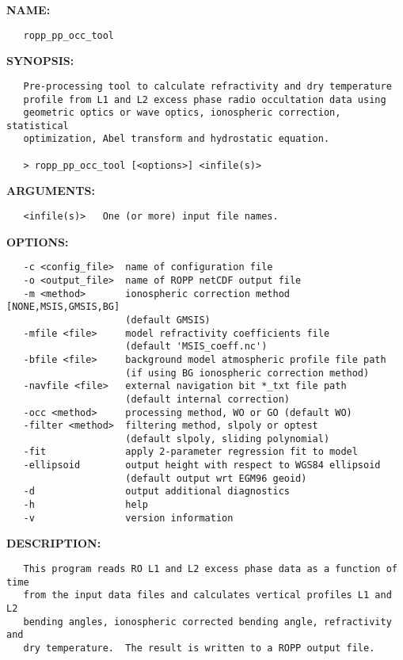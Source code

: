 \label{ch:robo90}
\label{ch:Programs_ropp_pp_occ_tool}
\textbf{NAME:}\hspace{0.08in}\begin{Verbatim}
   ropp_pp_occ_tool
\end{Verbatim}
\textbf{SYNOPSIS:}\hspace{0.08in}\begin{Verbatim}
   Pre-processing tool to calculate refractivity and dry temperature 
   profile from L1 and L2 excess phase radio occultation data using 
   geometric optics or wave optics, ionospheric correction, statistical 
   optimization, Abel transform and hydrostatic equation.

   > ropp_pp_occ_tool [<options>] <infile(s)>
\end{Verbatim}
\textbf{ARGUMENTS:}\hspace{0.08in}\begin{Verbatim}
   <infile(s)>   One (or more) input file names.
\end{Verbatim}
\textbf{OPTIONS:}\hspace{0.08in}\begin{Verbatim}
   -c <config_file>  name of configuration file
   -o <output_file>  name of ROPP netCDF output file
   -m <method>       ionospheric correction method [NONE,MSIS,GMSIS,BG]
                     (default GMSIS)
   -mfile <file>     model refractivity coefficients file
                     (default 'MSIS_coeff.nc')
   -bfile <file>     background model atmospheric profile file path
                     (if using BG ionospheric correction method)
   -navfile <file>   external navigation bit *_txt file path
                     (default internal correction)
   -occ <method>     processing method, WO or GO (default WO)
   -filter <method>  filtering method, slpoly or optest
                     (default slpoly, sliding polynomial)
   -fit              apply 2-parameter regression fit to model
   -ellipsoid        output height with respect to WGS84 ellipsoid
                     (default output wrt EGM96 geoid)
   -d                output additional diagnostics
   -h                help
   -v                version information
\end{Verbatim}
\textbf{DESCRIPTION:}\hspace{0.08in}\begin{Verbatim}
   This program reads RO L1 and L2 excess phase data as a function of time
   from the input data files and calculates vertical profiles L1 and L2
   bending angles, ionospheric corrected bending angle, refractivity and
   dry temperature.  The result is written to a ROPP output file.
\end{Verbatim}
